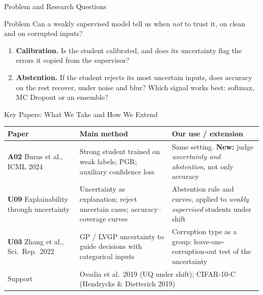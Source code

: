 \documentclass[aspectratio=169,10pt]{beamer}
\begin{document}
\begin{frame}{Problem and Research Questions}
\begin{block}{Problem}
Can a weakly supervised model tell us when \emph{not} to trust it, on clean and on corrupted inputs?
\end{block}
\vspace{0.3em}
\begin{enumerate}\small
\item \textbf{Calibration.} Is the student calibrated, and does its uncertainty flag the errors it copied
from the supervisor?
\item \textbf{Abstention.} If the student rejects its most uncertain inputs, does accuracy on the rest
recover, under noise and blur? Which signal works best: softmax, MC Dropout or an ensemble?
\end{enumerate}
\end{frame}

\begin{frame}{Key Papers: What We Take and How We Extend}
\footnotesize\setlength{\tabcolsep}{4pt}
\begin{tabular}{p{}p{}p{}}
\toprule
\textbf{Paper} & \textbf{Main method} & \textbf{Our use / extension}\\
\midrule
\textbf{A02} Burns et al., ICML 2024 & Strong student trained on weak labels; PGR; auxiliary confidence loss &
Same setting. \textbf{New:} judge \emph{uncertainty and abstention}, not only accuracy\\[0.4em]
\textbf{U09} Explainability through uncertainty & Uncertainty as explanation; reject uncertain cases;
accuracy--coverage curves & Abstention rule and curves, applied to \emph{weakly supervised} students under shift\\[0.4em]
\textbf{U03} Zhang et al., Sci.\ Rep.\ 2022 & GP / LVGP uncertainty to guide decisions with categorical inputs &
Corruption type as a group: leave-one-corruption-out test of the uncertainty\\
\midrule
Support & \multicolumn{2}{p{0.72\textwidth}}{Ovadia et al.\ 2019 (UQ under shift); CIFAR-10-C (Hendrycks \& Dietterich 2019)}\\
\bottomrule
\end{tabular}
\end{frame}
\end{document}
